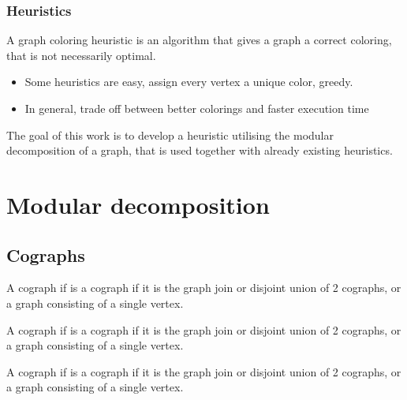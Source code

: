\documentclass[11pt]{beamer}
\begin{document}
\begin{frame}
    \frametitle{Heuristics}
    \begin{definition}
        A graph coloring heuristic is an algorithm that gives a graph a correct coloring, that is not necessarily optimal.
    \end{definition}
    \begin{itemize}
        \item Some heuristics are easy, assign every vertex a unique color, greedy.
        \item In general, trade off between better colorings and faster execution time
    \end{itemize}

\end{frame}

\begin{frame}
    
    The goal of this work is to develop a heuristic utilising the modular
    decomposition of a graph, that is used together with already existing heuristics.
    
\end{frame}

\section{Modular decomposition}

\subsection{Cographs}
\begin{frame}
    \begin{definition}[Cograph]
        A cograph if is a cograph if it is the graph join or disjoint union of 2
        cographs, or a graph consisting of a single vertex.
    \end{definition}
    \begin{definition}
        A cograph if is a cograph if it is the graph join or disjoint union of 2
        cographs, or a graph consisting of a single vertex.
    \end{definition}
    \begin{definition}
        A cograph if is a cograph if it is the graph join or disjoint union of 2
        cographs, or a graph consisting of a single vertex.
    \end{definition}

\end{frame}
\end{document}
